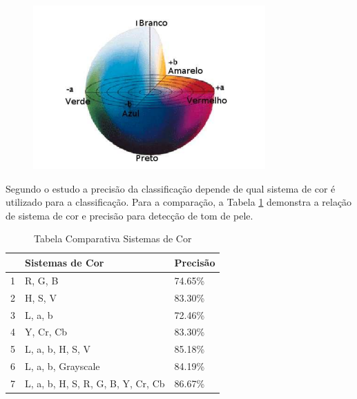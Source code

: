 \begin{figure}[h]
\caption{}
\centering

\includegraphics[]{Template_Latex_TCC-UNIFTEC/_lib/imagens/cielab.png}

\label{fig: cielab }
\end{figure}
 
Segundo o estudo \cite{Automatic_Skin_Tone_Extraction_for_Visagism_Applications}
a precisão da classificação depende de qual sistema de cor é utilizado para a classificação. Para a comparação, a Tabela \ref{table:Tabela_comparativa_sistemas_de_cores} demonstra a relação de sistema de cor e precisão para detecção de tom de pele.

\begin{table}[]
\centering
\caption{Tabela Comparativa Sistemas de Cor}
\label{table:Tabela_comparativa_sistemas_de_cores}\textbf{}
\begin{tabular}{lll}
\hline
  & Sistemas de Cor                   & Precisão \\ \hline
1 & R, G, B                           & 74.65\%  \\
2 & H, S, V                           & 83.30\%  \\
3 & L, a, b                           & 72.46\%  \\
4 & Y, Cr, Cb                         & 83.30\%  \\
5 & L, a, b, H, S, V                  & 85.18\%  \\
6 & L, a, b, Grayscale                & 84.19\%  \\
7 & L, a, b, H, S, R, G, B, Y, Cr, Cb & 86.67\%  \\ \hline
\end{tabular}%
\end{table}

